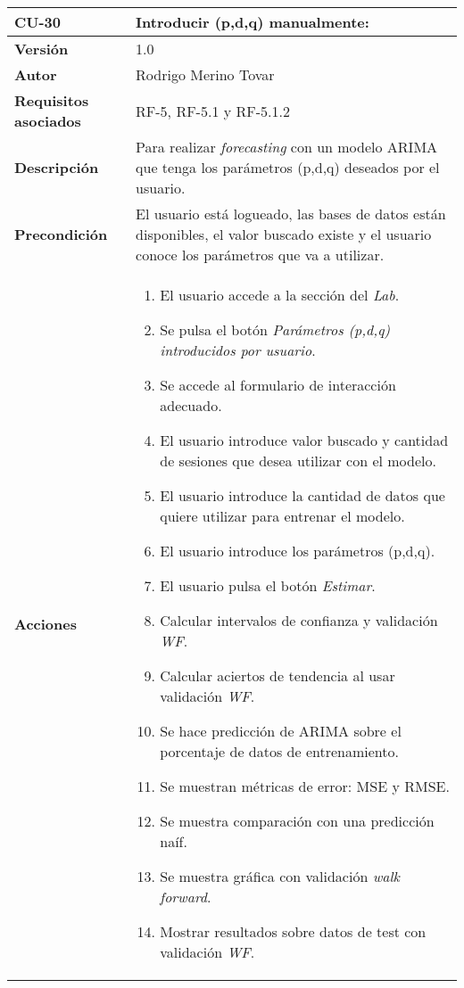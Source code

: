\begin{table}[p]
	\centering
	\begin{tabularx}{\linewidth}{ p{} p{} }
		\toprule
		\textbf{CU-30}    & \textbf{Introducir (p,d,q) manualmente:}\\
		\toprule
		\textbf{Versión}              & 1.0    \\
		\textbf{Autor}                & Rodrigo Merino Tovar \\
		\textbf{Requisitos asociados} & RF-5, RF-5.1 y RF-5.1.2  \\
		\textbf{Descripción}          & Para realizar \emph{forecasting} con un modelo ARIMA que tenga los parámetros (p,d,q) deseados por el usuario.\\
		\textbf{Precondición}         & El usuario está logueado, las bases de datos están disponibles, el valor buscado existe y el usuario conoce los parámetros que va a utilizar.  \\
		\textbf{Acciones}             &
		\begin{enumerate}
			\def\labelenumi{\arabic{enumi}.}
			\tightlist 
			\item El usuario accede a la sección del \emph{Lab}.
			\item Se pulsa el botón \emph{Parámetros (p,d,q) introducidos por usuario}. 
			\item Se accede al formulario de interacción adecuado. 
			\item El usuario introduce valor buscado y cantidad de sesiones que desea utilizar con el modelo. 
			\item El usuario introduce la cantidad de datos que quiere utilizar para entrenar el modelo.
			\item El usuario introduce los parámetros (p,d,q).
			\item El usuario pulsa el botón \emph{Estimar}.
			\item Calcular intervalos de confianza y validación \emph{WF}.
			\item Calcular aciertos de tendencia al usar validación \emph{WF}.
			\item Se hace predicción de ARIMA sobre el porcentaje de datos de entrenamiento.
			\item Se muestran métricas de error: MSE y RMSE. 
			\item Se muestra comparación con una predicción naíf.			
			\item Se muestra gráfica con validación \emph{walk forward}.
			\item Mostrar resultados sobre datos de test con validación \emph{WF}.

\end{enumerate}
\end{tabularx}
\end{table}
